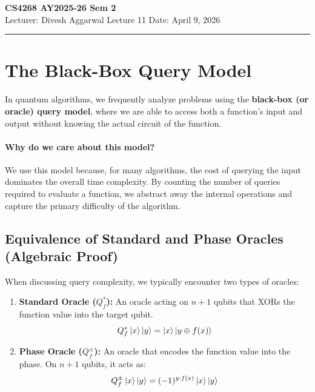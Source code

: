 



% 


\newpage
\noindent
\textbf{CS4268 AY2025-26 Sem 2}
\\
\noindent
Lecturer: Divesh Aggarwal
\hfill
Lecture 11                      %
\hfill
Date: April 9, 2026          %

\noindent
\rule{\textwidth}{1pt}

\medskip



\section{The Black-Box Query Model}
In quantum algorithms, we frequently analyze problems using the \textbf{black-box (or oracle) query model}, where we are able to access both a function's input and output without knowing the actual circuit of the function.

\paragraph{Why do we care about this model?}
We use this model because, for many algorithms, the cost of querying the input dominates the overall time complexity. By counting the number of queries required to evaluate a function, we abstract away the internal operations and capture the primary difficulty of the algorithm.

\subsection{Equivalence of Standard and Phase Oracles (Algebraic Proof)}
When discussing query complexity, we typically encounter two types of oracles:
\begin{enumerate}
    \item \textbf{Standard Oracle ($Q_f^*$):} An oracle acting on $n+1$ qubits that XORs the function value into the target qubit.
    \[ Q_f^* \ket{x} \ket{y} = \ket{x} \ket{y \oplus f(x)} \]
    \item \textbf{Phase Oracle ($Q_f^{\pm}$):} An oracle that encodes the function value into the phase. On $n+1$ qubits, it acts as:
    \[ Q_f^{\pm} \ket{x}\ket{y} = (-1)^{y \cdot f(x)} \ket{x}\ket{y} \]
\end{enumerate}

